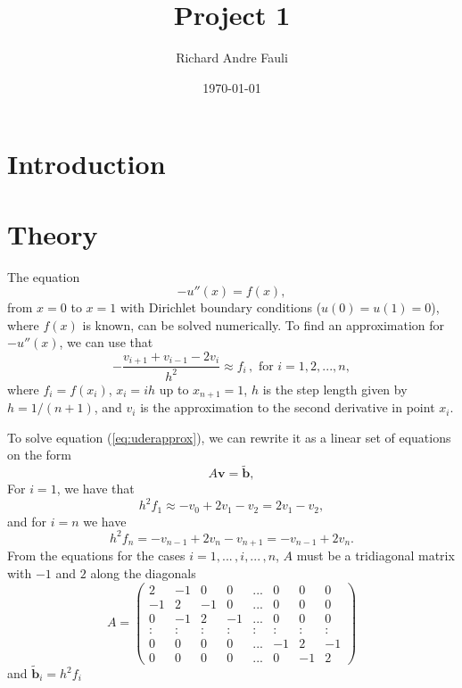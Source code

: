 \documentclass[norsk,a4paper,12pt]{article}
\title{Project 1}
\author{Richard Andre Fauli}
\date{\today}
\begin{document}
\maketitle

\begin{abstract}
\end{abstract}

\section{Introduction}
\section{Theory}

The equation
\begin{equation}
-u''(x) = f(x),
\label{eq:udereqf}
\end{equation}
from $x=0$ to $x=1$ with Dirichlet boundary conditions ($u(0)=u(1)=0$), where $f(x)$ is known, can be solved numerically. To find an approximation for $-u''(x)$, we can use that
\begin{equation}
-\frac{v_{i+1}+v_{i-1} - 2v_i}{h^2} \approx f_i\, , \text{ for } i = 1, 2, ..., n,
\label{eq:uderapprox}
\end{equation}
where $f_i=f(x_i)$, $x_i = ih$ up to $x_{n+1} = 1$, $h$ is the step length given by $h=1/(n+1)$, and $v_i$ is the approximation to the second derivative in point $x_i$. 

To solve equation (\ref{eq:uderapprox}), we can rewrite it as a linear set of equations on the form \begin{equation}
A\textbf{v} = \tilde{\textbf{b}},
\label{eq:Aveqb}
\end{equation} For $i=1$, we have that 
$$h^2f_1 \approx -v_0 + 2v_1 - v_2 = 2v_1-v_2,$$
and for $i=n$ we have 
$$h^2f_n = -v_{n-1} + 2v_n - v_{n+1} = -v_{n-1} + 2v_n.$$ From the equations for the cases $i=1,...\,,i,...\,,n$, $A$ must be a tridiagonal matrix with $-1$ and $2$ along the diagonals
$$A = \begin{pmatrix}
2&-1&0&0&...&0&0&0\\
-1&2&-1&0&...&0&0&0\\
0&-1&2&-1&...&0&0&0\\
:&:&:&:& : &:&:&:\\
0&0&0&0&...&-1&2&-1\\
0&0&0&0&...&0&-1&2
\end{pmatrix}$$
and $\tilde{\textbf{b}}_i = h^2f_i$
\end{document}
